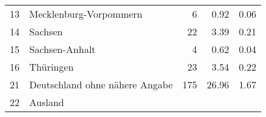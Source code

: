 \begin{longtable}{lXrrr}
     13 &
     \multicolumn{1}{X}{ Mecklenburg-Vorpommern   } &


       \num{6} &
       \num[round-mode=places,round-precision=2]{0.92} &
         \num[round-mode=places,round-precision=2]{0.06} \\

     14 &
     \multicolumn{1}{X}{ Sachsen   } &


       \num{22} &
       \num[round-mode=places,round-precision=2]{3.39} &
         \num[round-mode=places,round-precision=2]{0.21} \\

     15 &
     \multicolumn{1}{X}{ Sachsen-Anhalt   } &


       \num{4} &
       \num[round-mode=places,round-precision=2]{0.62} &
         \num[round-mode=places,round-precision=2]{0.04} \\

     16 &
     \multicolumn{1}{X}{ Thüringen   } &


       \num{23} &
       \num[round-mode=places,round-precision=2]{3.54} &
         \num[round-mode=places,round-precision=2]{0.22} \\

     21 &
     \multicolumn{1}{X}{ Deutschland ohne nähere Angabe   } &


       \num{175} &
       \num[round-mode=places,round-precision=2]{26.96} &
         \num[round-mode=places,round-precision=2]{1.67} \\

     22 &
     \multicolumn{1}{X}{ Ausland   } &



\end{longtable}
